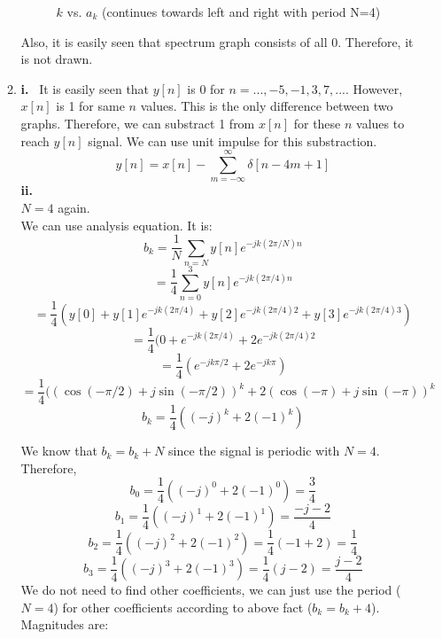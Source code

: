 \documentclass[10pt,a4paper, margin=1in]{article}
\begin{document}
\begin{enumerate}
\begin{enumerate}
        \begin{figure} [H]
    \centering
    \caption{$k$ vs. $a_k$ (continues towards left and right with period N=4)}
    \label{fig:q7a}
\end{figure}

Also, it is easily seen that spectrum graph consists of all $0$. Therefore, it is not drawn.

    \item %
    
    \textbf{i.} \ It is easily seen that $y[n]$ is 0 for $n = ..., -5 ,-1 ,3, 7, ...$. However, $x[n]$ is 1 for same $n$ values. This is the only difference between two graphs. Therefore, we can substract 1 from $x[n]$ for these $n$ values to reach $y[n]$ signal. We can use unit impulse for this substraction. \\
    \[ y[n] = x[n] - \sum_{m= -\infty}^{\infty} \delta[n-4m+1] \]
    \textbf{ii.} \\
    $N = 4$ again. \\
    We can use analysis equation. It is: \\
    \[ b_k = \frac{1}{N} \sum_{n=N}^{} y[n]e^{-jk(2\pi/N)n} \]
    \[ = \frac{1}{4} \sum_{n=0}^{3} y[n]e^{-jk(2\pi/4)n} \]
    \[ = \frac{1}{4}(y[0] + y[1]e^{-jk(2\pi/4)} + y[2]e^{-jk(2\pi/4)2} + y[3]e^{-jk(2\pi/4)3}) \]
     \[ = \frac{1}{4}(0 + e^{-jk(2\pi/4)} + 2e^{-jk(2\pi/4)2} \]
     \[ = \frac{1}{4}(e^{-jk \pi/2} + 2e^{-jk\pi}) \]
     \[ = \frac{1}{4}((\cos(-\pi/2) + j\sin(-\pi/2))^k + 2(\cos(-\pi) + j\sin(-\pi))^k \]
     \[ b_k = \frac{1}{4}((-j)^k + 2(-1)^k) \]
     
     We know that $b_k = b_k + N$ since the signal is periodic with $N = 4$. Therefore, \\
     \[ b_0 = \frac{1}{4}((-j)^0 + 2(-1)^0) = \frac{3}{4}  \]
     \[ b_1 = \frac{1}{4}((-j)^1 + 2(-1)^1) = \frac{-j-2}{4} \]
     \[ b_2 = \frac{1}{4}((-j)^2 + 2(-1)^2) = \frac{1}{4}(-1 + 2) = \frac{1}{4}  \]
     \[ b_3 = \frac{1}{4}((-j)^3 + 2(-1)^3) = \frac{1}{4}(j - 2) =  \frac{j-2}{4}  \]
     We do not need to find other coefficients, we can just use the period ($N=4$) for other coefficients according to above fact ($b_k = b_k + 4$). Magnitudes are: \\
     

\end{enumerate}
\end{enumerate}
\end{document}
